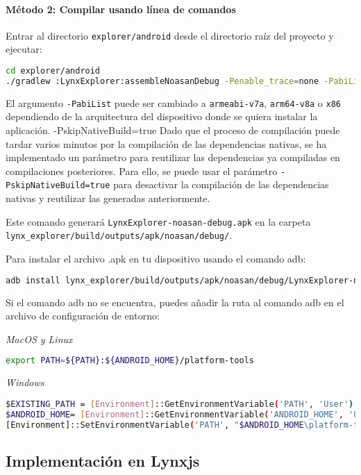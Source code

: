 \paragraph{Método 2: Compilar usando línea de comandos}
Entrar al directorio \texttt{explorer/android} desde el directorio raíz del proyecto y ejecutar:
\begin{lstlisting}[language=bash]
cd explorer/android
./gradlew :LynxExplorer:assembleNoasanDebug -Penable_trace=none -PabiList=x86_64
\end{lstlisting}
El argumento \texttt{-PabiList} puede ser cambiado a \texttt{armeabi-v7a}, \texttt{arm64-v8a} o \texttt{x86} dependiendo de la arquitectura del dispositivo donde se quiera instalar la aplicación.
-PskipNativeBuild=true
Dado que el proceso de compilación puede tardar varios minutos por la compilación de las dependencias nativas, se ha implementado un parámetro para reutilizar las dependencias ya compiladas en compilaciones posteriores. Para ello, se puede usar el parámetro \texttt{-PskipNativeBuild=true} para desactivar la compilación de las dependencias nativas y reutilizar las generadas anteriormente.

Este comando generará \texttt{LynxExplorer-noasan-debug.apk} en la carpeta \\
\texttt{lynx\_explorer/build/outputs/apk/noasan/debug/}.

Para instalar el archivo .apk en tu dispositivo usando el comando adb:
\begin{lstlisting}[language=bash]
adb install lynx_explorer/build/outputs/apk/noasan/debug/LynxExplorer-noasan-debug.apk
\end{lstlisting}

Si el comando adb no se encuentra, puedes añadir la ruta al comando adb en el archivo de configuración de entorno:

\textit{MacOS y Linux}
\begin{lstlisting}[language=bash]
export PATH=${PATH}:${ANDROID_HOME}/platform-tools
\end{lstlisting}

\textit{Windows}
\begin{lstlisting}[language=bash]
$EXISTING_PATH = [Environment]::GetEnvironmentVariable('PATH', 'User')
$ANDROID_HOME= [Environment]::GetEnvironmentVariable('ANDROID_HOME', 'User')
[Environment]::SetEnvironmentVariable('PATH', "$ANDROID_HOME\platform-tools;$EXISTING_PATH ", 'User')
\end{lstlisting}

\subsection{Implementación en Lynxjs}
